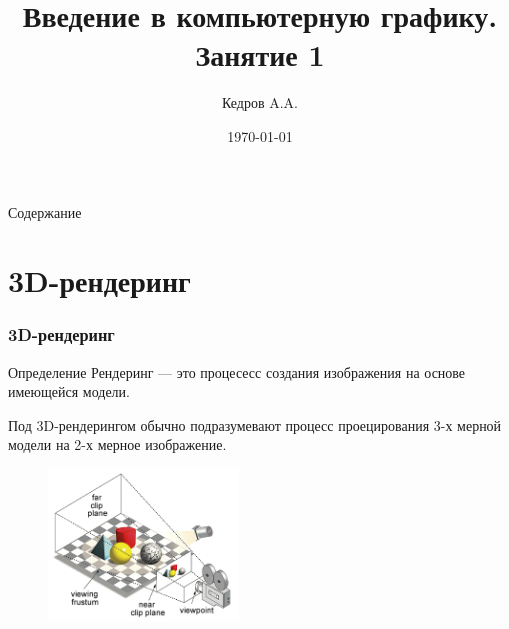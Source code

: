\documentclass{beamer}
\title{Введение в компьютерную графику. Занятие 1}
\author{Кедров A.A.}
\institute{Математическое моделирование (на английском языке)}
\date{\today}
\begin{document}
\begin{frame}
\titlepage
\end{frame}

\begin{frame}{Содержание}
    \tableofcontents
\end{frame}

\section{3D-рендеринг}

\begin{frame}
\frametitle{3D-рендеринг}
\begin{alertblock}{Определение} 
\alert{Рендеринг} --- это процесесс создания изображения на основе имеющейся модели.
\end{alertblock}

Под \alert{3D-рендерингом} обычно подразумевают процесс проецирования 3-х мерной модели на 2-х мерное изображение.

\begin{figure}
\centering
\includegraphics[width=0.45\textwidth]{3d-graphics.png}
\end{figure}

\end{frame}
\end{document}
